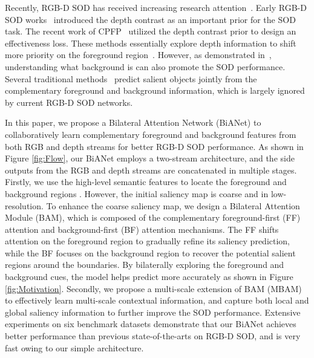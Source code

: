 \documentclass[journal]{IEEEtran}
\newcommand{\figref}[1]{Figure \ref{#1}}
\begin{document}
Recently, RGB-D SOD has received increasing research attention~\cite{chen2019three,piao2019depth}.
Early RGB-D SOD works~\cite{peng2014rgbd,ren2015exploiting,song2017depth} introduced the depth contrast as an important prior for the SOD task.
The recent work of CPFP~\cite{zhao2019Contrast} utilized the depth contrast prior to design an effectiveness loss.
These methods essentially explore depth information to shift more priority on the foreground region~\cite{chen2018progressively,chen2020improved}.
However, as demonstrated in~\cite{liang2018stereoscopic,xia2017what,xiao2018rgb}, understanding what background is can also promote the SOD performance.
Several traditional methods~\cite{li2015robust,yang2013saliency} predict salient objects jointly from the complementary foreground and background information, which is largely ignored by current RGB-D SOD networks.

In this paper, we propose a Bilateral Attention Network (BiANet) to collaboratively learn complementary foreground and background features from both RGB and depth streams for better RGB-D SOD performance.   
As shown in \figref{fig:Flow}, our BiANet employs a two-stream architecture, and the side outputs from the RGB and depth streams are concatenated in multiple stages.
Firstly, we use the high-level semantic features  to locate the foreground and background regions .
However, the initial saliency map  is coarse and in low-resolution.
To enhance the coarse saliency map, we design a Bilateral Attention Module (BAM), which is composed of the complementary foreground-first (FF) attention and background-first (BF) attention mechanisms.
The FF shifts attention on the foreground region to gradually refine its saliency prediction, while the BF focuses on the background region to recover the potential salient regions around the boundaries.
By bilaterally exploring the foreground and background cues,
the model helps predict more accurately
as shown in \figref{fig:Motivation}.
Secondly, we propose a multi-scale extension of BAM (MBAM) to effectively learn multi-scale contextual information, 
and capture both local and global saliency information to further improve the SOD performance.
Extensive experiments on six benchmark datasets demonstrate that our BiANet achieves better performance than previous state-of-the-arts on RGB-D SOD, and is very fast owing to our simple architecture.
\end{document}
